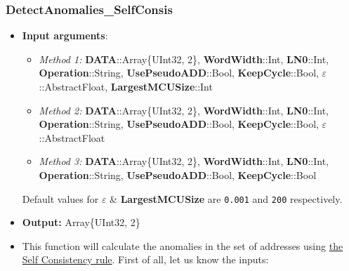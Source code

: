 \subsubsection*{DetectAnomalies\_SelfConsis}\label{Fun:DetectAnomaliesSelfConsis}
\begin{itemize}
	\item \textbf{Input arguments}:
	\begin{itemize}
		\item  \textit{Method 1: }\textbf{DATA}::Array\{UInt32, 2\}, 
		\textbf{WordWidth}::Int,
		\textbf{LN0}::Int,
		\textbf{Operation}::String,
		\textbf{UsePseudoADD}::Bool,
		\textbf{KeepCycle}::Bool,
		\textbf{\(\varepsilon\)}::AbstractFloat,
		\textbf{LargestMCUSize}::Int
		\item  \textit{Method 2: }\textbf{DATA}::Array\{UInt32, 2\}, 
		\textbf{WordWidth}::Int,
		\textbf{LN0}::Int,
		\textbf{Operation}::String,
		\textbf{UsePseudoADD}::Bool,
		\textbf{KeepCycle}::Bool,
		\textbf{\(\varepsilon\)}::AbstractFloat
		\item  \textit{Method 3: }\textbf{DATA}::Array\{UInt32, 2\}, 
		\textbf{WordWidth}::Int,
		\textbf{LN0}::Int,
		\textbf{Operation}::String,
		\textbf{UsePseudoADD}::Bool,
		\textbf{KeepCycle}::Bool
	\end{itemize}

	Default values for \textbf{\(\varepsilon\)} \& 	\textbf{LargestMCUSize} are \texttt{0.001} and \texttt{200} respectively.
	\item \textbf{Output: } Array\{UInt32, 2\}	
	\item This function will calculate the anomalies in the set of addresses using \hyperref[Subsec:SelfConsistencyRule]{the Self Consistency rule}. 
	 First of all, let us know the inputs:
	 \begin{itemize}
	

\end{itemize}
\end{itemize}
